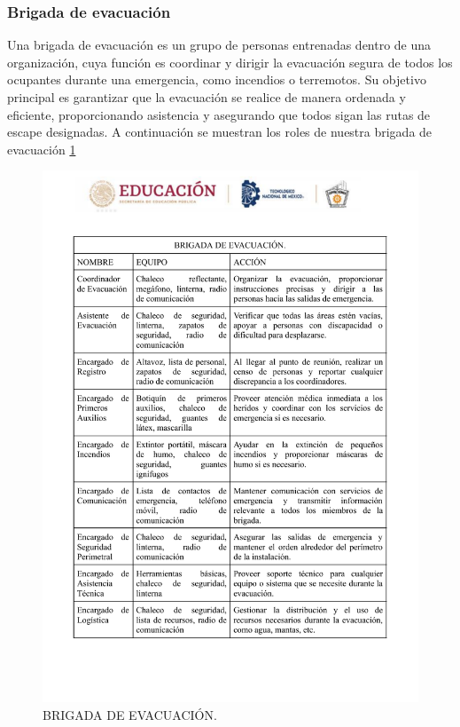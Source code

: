     \subsubsection{Brigada de evacuación}
    Una brigada de evacuación es un grupo de personas entrenadas dentro de una organización, cuya función es coordinar y dirigir la evacuación segura de todos los ocupantes durante una emergencia, como incendios o terremotos. Su objetivo principal es garantizar que la evacuación se realice de manera ordenada y eficiente, proporcionando asistencia y asegurando que todos sigan las rutas de escape designadas. A continuación se muestran los roles de nuestra brigada de evacuación \ref{BRIGADA DE EVACUACION}
    \begin{figure}
        \centering
    \includegraphics[trim = {0mm 0mm 0mm 0mm},clip,scale=0.3]{24/Img/brigadadeEvacuacion.pdf}
        \caption{BRIGADA DE EVACUACIÓN.}
        \label{BRIGADA DE EVACUACION}
    \end{figure}
